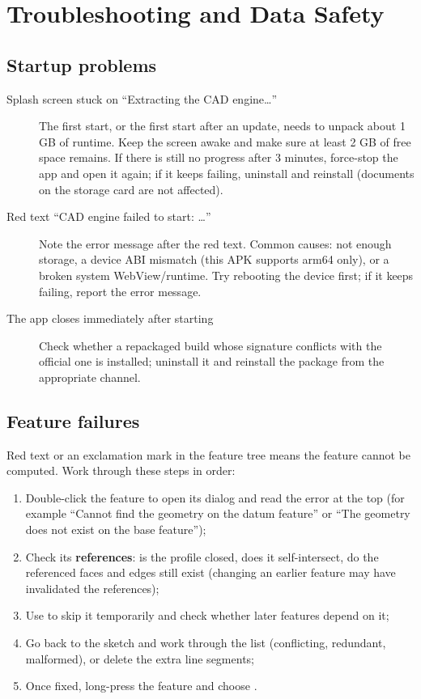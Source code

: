 \chapter{Troubleshooting and Data Safety}

\section{Startup problems}

\begin{description}
  \item[Splash screen stuck on ``Extracting the CAD engine\ldots{}''] The first start, or the first start after an update,
        needs to unpack about 1 GB of runtime. Keep the screen awake and make sure at least 2 GB of free space remains.
        If there is still no progress after 3 minutes, force-stop the app and open it again; if it keeps failing,
        uninstall and reinstall (documents on the storage card are not affected).
  \item[Red text ``CAD engine failed to start: \ldots{}''] Note the error message after the red text. Common causes:
        not enough storage, a device ABI mismatch (this APK supports arm64 only), or a broken system WebView/runtime.
        Try rebooting the device first; if it keeps failing, report the error message.
  \item[The app closes immediately after starting] Check whether a repackaged build whose signature conflicts with
        the official one is installed; uninstall it and reinstall the package from the appropriate channel.
\end{description}

\section{Feature failures}

Red text or an exclamation mark in the feature tree means the feature cannot be computed. Work through these steps in order:

\begin{enumerate}
  \item Double-click the feature to open its dialog and read the error at the top (for example ``Cannot find the geometry on the datum feature'' or ``The geometry does not exist on the base feature'');
  \item Check its \textbf{references}: is the profile closed, does it self-intersect, do the referenced faces and edges still exist (changing an earlier feature may have invalidated the references);
  \item Use  to skip it temporarily and check whether later features depend on it;
  \item Go back to the sketch and work through the  list (conflicting, redundant, malformed), or delete the extra line segments;
  \item Once fixed, long-press the feature and choose .
\end{enumerate}

